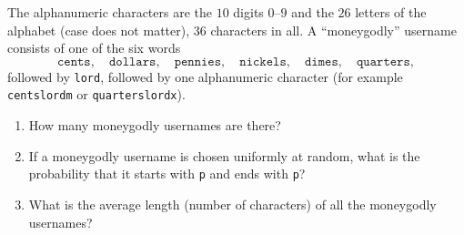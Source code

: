 The alphanumeric characters are the $10$ digits $0$--$9$ and the $26$ letters of the alphabet (case does not matter), $36$ characters in all. A ``moneygodly'' username consists of one of the six words
\[\texttt{cents},\quad\texttt{dollars},\quad\texttt{pennies},\quad\texttt{nickels},\quad\texttt{dimes},\quad\texttt{quarters},\]
followed by \texttt{lord}, followed by one alphanumeric character (for example \texttt{centslordm} or \texttt{quarterslordx}).
\begin{enumerate}
\item[(a)] How many moneygodly usernames are there?
\item[(b)] If a moneygodly username is chosen uniformly at random, what is the probability that it starts with \texttt{p} and ends with \texttt{p}?
\item[(c)] What is the average length (number of characters) of all the moneygodly usernames?
\end{enumerate}
